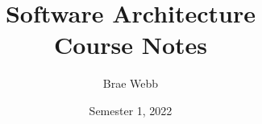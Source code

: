 \documentclass{csse4400}
\title{Software Architecture\\Course Notes}
\author{Brae Webb}
\date{Semester 1, 2022}
\begin{document}
\makecover

\tableofcontents\newpage

\newpage
\newpage
\newpage
\newpage
\newpage
\newpage



\end{document}
